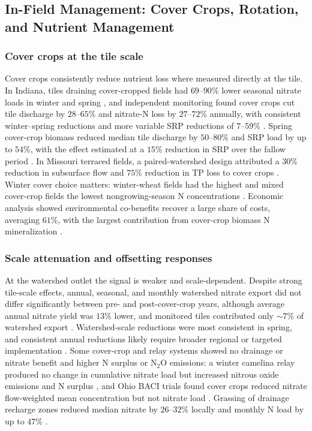 \subsection{In-Field Management: Cover Crops, Rotation, and Nutrient Management}

\subsubsection{Cover crops at the tile scale}

Cover crops consistently reduce nutrient loss where measured directly at
the tile. In Indiana, tiles draining cover-cropped fields had
$69$--$90\%$ lower seasonal nitrate loads in winter and spring
\parencite{Hanrahan2018}, and independent monitoring found cover crops cut
tile discharge by $28$--$65\%$ and nitrate-N loss by $27$--$72\%$ annually,
with consistent winter--spring reductions and more variable SRP reductions
of $7$--$59\%$ \parencite{Speir2022}. Spring cover-crop biomass reduced
median tile discharge by $50$--$80\%$ and SRP load by up to $54\%$, with
the effect estimated at a $15\%$ reduction in SRP over the fallow period
\parencite{Trentman2020}. In Missouri terraced fields, a paired-watershed
design attributed a $30\%$ reduction in subsurface flow and $75\%$
reduction in TP loss to cover crops \parencite{SalcedaGonzalez2025}. Winter
cover choice matters: winter-wheat fields had the highest and mixed
cover-crop fields the lowest nongrowing-season N concentrations
\parencite{McNeill2026}. Economic analysis showed environmental
co-benefits recover a large share of costs, averaging $61\%$, with the
largest contribution from cover-crop biomass N mineralization
\parencite{Roth2018}.

\subsubsection{Scale attenuation and offsetting responses}

At the watershed outlet the signal is weaker and scale-dependent. Despite
strong tile-scale effects, annual, seasonal, and monthly watershed nitrate
export did not differ significantly between pre- and post-cover-crop years,
although average annual nitrate yield was $13\%$ lower, and monitored tiles
contributed only $\sim7\%$ of watershed export \parencite{Hanrahan2018}.
Watershed-scale reductions were most consistent in spring, and consistent
annual reductions likely require broader regional or targeted
implementation \parencite{Speir2022}. Some cover-crop and relay systems
showed no drainage or nitrate benefit and higher N surplus or N$_2$O
emissions: a winter camelina relay produced no change in cumulative
nitrate load but increased nitrous oxide emissions and N surplus
\parencite{Emmett2022}, and Ohio BACI trials found cover crops reduced
nitrate flow-weighted mean concentration but not nitrate load
\parencite{Askar2023}. Grassing of drainage recharge zones reduced median
nitrate by $26$--$32\%$ locally and monthly N load by up to $47\%$
\parencite{Fucík2015,Kvítek2023}.

